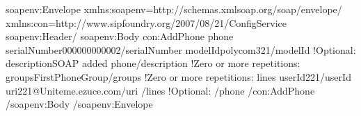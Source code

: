 \documentclass[letterpaper,10pt,english]{sphinxmanual}
\begin{document}
\begin{sphinxVerbatim}[commandchars=\\\{\}]
\PYGZlt{}soapenv:Envelope xmlns:soapenv=\PYGZdq{}http://schemas.xmlsoap.org/soap/envelope/\PYGZdq{} xmlns:con=\PYGZdq{}http://www.sipfoundry.org/2007/08/21/ConfigService\PYGZdq{}\PYGZgt{}
\PYGZlt{}soapenv:Header/\PYGZgt{}
\PYGZlt{}soapenv:Body\PYGZgt{}
\PYGZlt{}con:AddPhone\PYGZgt{}
\PYGZlt{}phone\PYGZgt{}
\PYGZlt{}serialNumber\PYGZgt{}000000000002\PYGZlt{}/serialNumber\PYGZgt{}
\PYGZlt{}modelId\PYGZgt{}polycom321\PYGZlt{}/modelId\PYGZgt{}
\PYGZlt{}!\PYGZhy{}Optional:\PYGZhy{}\PYGZgt{}
\PYGZlt{}description\PYGZgt{}SOAP added phone\PYGZlt{}/description\PYGZgt{}
\PYGZlt{}!\PYGZhy{}Zero or more repetitions:\PYGZhy{}\PYGZgt{}
\PYGZlt{}groups\PYGZgt{}FirstPhoneGroup\PYGZlt{}/groups\PYGZgt{}
\PYGZlt{}!\PYGZhy{}Zero or more repetitions:\PYGZhy{}\PYGZgt{}
\PYGZlt{}lines\PYGZgt{}
\PYGZlt{}userId\PYGZgt{}221\PYGZlt{}/userId\PYGZgt{}
\PYGZlt{}uri\PYGZgt{}221@Uniteme.ezuce.com\PYGZlt{}/uri\PYGZgt{}
\PYGZlt{}/lines\PYGZgt{}
\PYGZlt{}!\PYGZhy{}Optional:\PYGZhy{}\PYGZgt{}
\PYGZlt{}/phone\PYGZgt{}
\PYGZlt{}/con:AddPhone\PYGZgt{}
\PYGZlt{}/soapenv:Body\PYGZgt{}
\PYGZlt{}/soapenv:Envelope\PYGZgt{}
\end{sphinxVerbatim}

\end{document}
